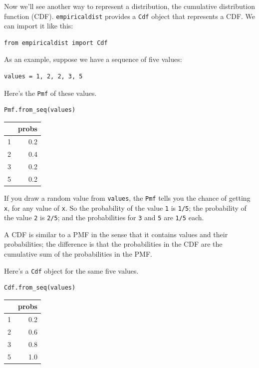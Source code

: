 Now we'll see another way to represent a distribution, the cumulative
distribution function (CDF). \passthrough{\lstinline!empiricaldist!}
provides a \passthrough{\lstinline!Cdf!} object that represents a CDF.
We can import it like this:

\begin{lstlisting}[]
from empiricaldist import Cdf
\end{lstlisting}

As an example, suppose we have a sequence of five values:

\begin{lstlisting}[]
values = 1, 2, 2, 3, 5  
\end{lstlisting}

Here's the \passthrough{\lstinline!Pmf!} of these values.

\begin{lstlisting}[]
Pmf.from_seq(values)
\end{lstlisting}

\begin{tabular}{lr}
\midrule
{} &  probs \\
\midrule
1 &    0.2 \\
2 &    0.4 \\
3 &    0.2 \\
5 &    0.2 \\
\midrule
\end{tabular}

If you draw a random value from \passthrough{\lstinline!values!}, the
\passthrough{\lstinline!Pmf!} tells you the chance of getting
\passthrough{\lstinline!x!}, for any value of
\passthrough{\lstinline!x!}. So the probability of the value
\passthrough{\lstinline!1!} is \passthrough{\lstinline!1/5!}; the
probability of the value \passthrough{\lstinline!2!} is
\passthrough{\lstinline!2/5!}; and the probabilities for
\passthrough{\lstinline!3!} and \passthrough{\lstinline!5!} are
\passthrough{\lstinline!1/5!} each.

A CDF is similar to a PMF in the sense that it contains values and their
probabilities; the difference is that the probabilities in the CDF are
the cumulative sum of the probabilities in the PMF.

Here's a \passthrough{\lstinline!Cdf!} object for the same five values.

\begin{lstlisting}[]
Cdf.from_seq(values)
\end{lstlisting}

\begin{tabular}{lr}
\midrule
{} &  probs \\
\midrule
1 &    0.2 \\
2 &    0.6 \\
3 &    0.8 \\
5 &    1.0 \\
\midrule
\end{tabular}


